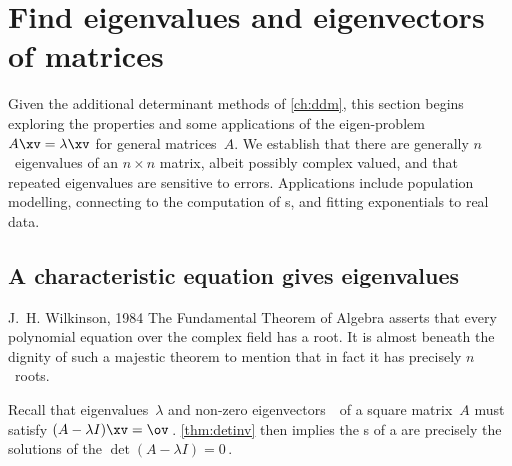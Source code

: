 

\section{Find eigenvalues and eigenvectors of matrices}
\label{sec:eennm}

\secttoc

Given the additional determinant methods of \autoref{ch:ddm}, this section begins exploring the properties and some applications of the eigen-problem \(A\xv=\lambda\xv\) for general matrices~\(A\).
We establish that there are generally \(n\)~eigenvalues of an \(n\times n\) matrix, albeit possibly complex valued, and that repeated eigenvalues are sensitive to errors.
Applications include population modelling, connecting to the computation of \svd{}s, and fitting exponentials to real data.




\subsection{A characteristic equation gives eigenvalues}
\label{sec:cege}

\begin{quoted}{J.~H. Wilkinson, 1984 \cite[p.103]{Higham1996}}
The Fundamental Theorem of Algebra asserts that every polynomial equation over the complex field has a root.  
It is almost beneath the dignity of such a majestic theorem to mention that in fact it has precisely \(n\)~roots.
\end{quoted}


Recall that eigenvalues~\(\lambda\) and non-zero eigenvectors~\xv\ of a square matrix~\(A\) must satisfy \((A-\lambda I)\xv=\ov\)\,.
\autoref{thm:detinv} then implies the s of a  are precisely the solutions of the  \(\det(A-\lambda I)=0\)\,.  

